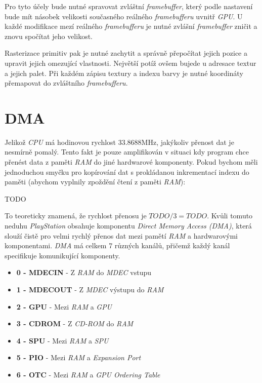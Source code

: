 Pro tyto účely bude nutné spravovat zvláštní \textit{framebuffer}, který podle nastavení bude mít násobek velikosti
současného reálného \textit{framebufferu} uvnitř \textit{GPU}. U každé modifikace mezí reálného \textit{framebufferu} je
nutné zvlášní \textit{framebuffer} zničit a znovu spočítat jeho velikost.

Rasterizace primitiv pak je nutné zachytit a správně přepočítat jejich pozice a upravit jejich omezující vlastnosti.
Největší potíž ovšem bujede u adresace textur a jejich palet. Při každém zápisu textury a indexu barvy je nutné koordináty
přemapovat do zvláštního \textit{framebufferu}.

\section{DMA}

Jelikož \textit{CPU} má hodinovou rychlost 33.8688MHz, jakýkoliv přenost dat je nesmírně pomalý. Tento fakt je pouze amplifikován v situaci
kdy program chce přenést data z paměti \textit{RAM} do jiné hardwarové komponenty. Pokud bychom měli jednoduchou smyčku pro kopírování
dat s prokládanou inkrementací indexu do paměti (abychom vyplnily zpoždění čtení z paměti \textit{RAM}):

TODO

To teoreticky znamená, že rychlost přenosu je $TODO/3=TODO$. Kvůli tomuto neduhu \textit{PlayStation} obsahuje komponentu \textit{Direct Memory Access (DMA)},
která slouží čistě pro velmi rychlý přenos dat mezi pamětí \textit{RAM} a hardwarovými komponentami. \textit{DMA} má celkem 7 různých kanálů,
přičemž každý kanál specifikuje komunikující komponenty. 

\begin{itemize}
    \item{\textbf{0 - MDECIN} - Z \textit{RAM} do \textit{MDEC} vstupu}
    \item{\textbf{1 - MDECOUT} - Z \textit{MDEC} výstupu do \textit{RAM}}
    \item{\textbf{2 - GPU} - Mezi \textit{RAM} a \textit{GPU}}
    \item{\textbf{3 - CDROM} - Z \textit{CD-ROM} do \textit{RAM}}
    \item{\textbf{4 - SPU} - Mezi \textit{RAM} a \textit{SPU}}
    \item{\textbf{5 - PIO} - Mezi \textit{RAM} a \textit{Expansion Port}}
    \item{\textbf{6 - OTC} - Mezi \textit{RAM} a \textit{GPU Ordering Table}}
\end{itemize}

